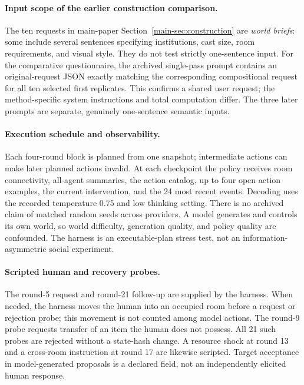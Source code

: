 \paragraph{Input scope of the earlier construction comparison.}
The ten requests in main-paper Section~\ref{main-sec:construction} are \emph{world briefs}:
some include several sentences specifying institutions, cast size, room
requirements, and visual style. They do not test strictly one-sentence input.
For the comparative questionnaire, the archived single-pass prompt contains
an original-request JSON exactly matching the corresponding compositional
request for all ten selected first replicates. This confirms a shared user
request; the method-specific system instructions and total computation differ.
The three later prompts are separate, genuinely one-sentence semantic inputs.

\paragraph{Execution schedule and observability.}
Each four-round block is planned from one snapshot; intermediate actions can
make later planned actions invalid. At each checkpoint the policy receives
room connectivity, all-agent summaries, the action catalog, up to four open
action examples, the current intervention, and the 24 most recent events.
Decoding uses the recorded temperature 0.75 and low thinking setting. There is
no archived claim of matched random seeds across providers. A model generates
and controls its own world, so world difficulty, generation quality, and
policy quality are confounded. The harness is an executable-plan stress test,
not an information-asymmetric social experiment.

\paragraph{Scripted human and recovery probes.}
The round-5 request and round-21 follow-up are supplied by the harness.
When needed, the harness moves the human into an occupied room before a
request or rejection probe; this movement is not counted among model actions.
The round-9 probe requests transfer of an item the human does not possess.
All 21 such probes are rejected without a state-hash change. A resource shock
at round 13 and a cross-room instruction at round 17 are likewise scripted.
Target acceptance in model-generated proposals is a declared field, not an
independently elicited human response.


